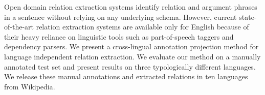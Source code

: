 Open domain relation extraction systems identify relation and argument phrases in a sentence without relying on any underlying schema. However, current state-of-the-art relation extraction systems are available only for English because of their heavy reliance on linguistic tools such as part-of-speech taggers and dependency parsers. We present a cross-lingual annotation projection method for language independent relation extraction. We evaluate our method on a manually annotated test set and present results on three typologically different languages. We release these manual annotations and extracted relations in ten languages from Wikipedia.
